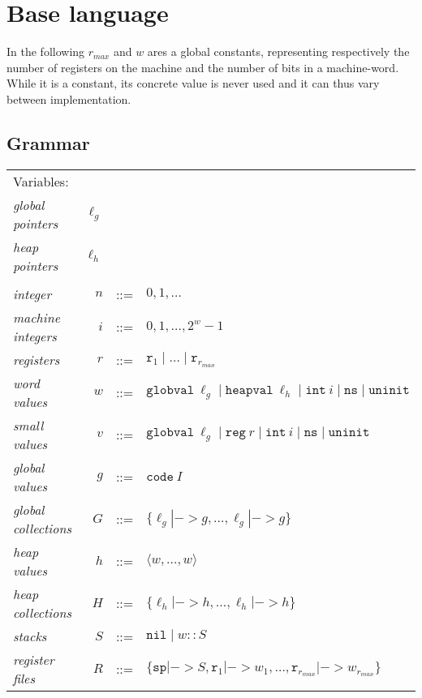 \section{Base language}

In the following $r_{max}$ and $w$ ares a global constants, representing
respectively the number of registers on the machine and the number of bits in a
machine-word. While it is a constant, its concrete value is never used and it
can thus vary between implementation.
\\

\subsection{Grammar}

\begin{tabular}{lrcl}
Variables: \\
\textit{global pointers}    & $\ell_g$ \\
\textit{heap pointers}      & $\ell_h$ \\
\\
\textit{integer}            & $n$ & ::= & $0, 1, \dots$ \\
\textit{machine integers}   & $i$ & ::= & $0, 1, \dots, 2^{w}-1$ \\
\textit{registers}          & $r$ & ::= & $\mathtt{r}_1 \mid \dots \mid \mathtt{r}_{r_{max}}$ \\
\textit{word values}        & $w$ & ::= & $\mathtt{globval}\ \ell_g \mid \mathtt{heapval}\ \ell_h \mid \mathtt{int}\ i \mid \mathtt{ns} \mid \mathtt{uninit}$ \\
\textit{small values}       & $v$ & ::= & $\mathtt{globval}\ \ell_g \mid \mathtt{reg}\ r \mid \mathtt{int}\ i \mid \mathtt{ns} \mid \mathtt{uninit}$ \\
\textit{global values}      & $g$ & ::= & $\mathtt{code}\ I$ \\
\textit{global collections} & $G$ & ::= & $\{\ell_g |-> g, \dots, \ell_g |-> g\}$ \\
\textit{heap values}        & $h$ & ::= & $\langle w, \dots, w \rangle$ \\
\textit{heap collections}   & $H$ & ::= & $\{\ell_h |-> h, \dots, \ell_h |-> h\}$ \\
\textit{stacks}             & $S$ & ::= & $\mathtt{nil} \mid w :: S$ \\
\textit{register files}     & $R$ & ::= & $\{\mathtt{sp} |-> S, \mathtt{r}_1 |-> w_1, \dots, \mathtt{r}_{r_{max}} |-> w_{r_{max}}\}$ \\

\end{tabular}
